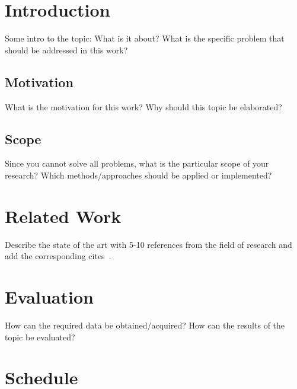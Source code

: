 \documentclass[expose, en]{thesis}
\begin{document}
\maketitle


\section{Introduction}
Some intro to the topic: What is it about? What is the specific problem
that should be addressed in this work?

\subsection{Motivation}
What is the motivation for this work? Why should this topic be
elaborated?

\subsection{Scope}
Since you cannot solve all problems, what is the particular scope of
your research? Which methods/approaches should be applied or
implemented?


\section{Related Work}
Describe the state of the art with \num{5}-\num{10} references from the
field of research and add the corresponding
cites~\cite{website:google}.


\section{Evaluation}
How can the required data be obtained/acquired? How can the results of
the topic be evaluated?

\clearpage
\section{Schedule}

\end{document}
